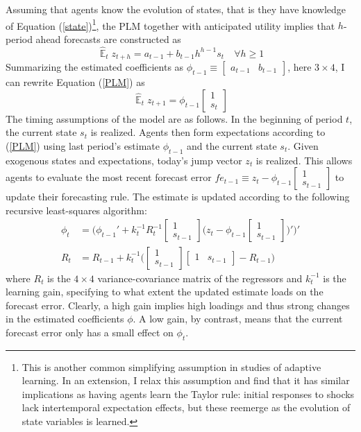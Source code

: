 \documentclass[11pt]{article}
\renewcommand{\[}{\begin{equation}}
\renewcommand{\]}{\end{equation}}
\DeclareMathOperator{\E}{\mathbb{E}}
\begin{document}
Assuming that agents know the evolution of states, that is they have knowledge of Equation (\ref{state})\footnote{This is another common simplifying assumption in studies of adaptive learning. In an extension, I relax this assumption and find that it has similar implications as having agents learn the Taylor rule: initial responses to shocks lack intertemporal expectation effects, but these reemerge as the evolution of state variables is learned.}, the PLM together with anticipated utility implies that $h$-period ahead forecasts are constructed as
\begin{equation}
\hat{\E}_t z_{t+h} = a_{t-1} + b_{t-1}h^{h-1}s_t  \quad \forall h\geq 1 \label{PLM_fcst_general}
\end{equation}
Summarizing the estimated coefficients as $\phi_{t-1} \equiv \begin{bmatrix}a_{t-1} & b_{t-1}\end{bmatrix}$, here $3\times 4$, I can rewrite Equation (\ref{PLM}) as 
\begin{equation} 
\hat{\E}_t z_{t+1} = \phi_{t-1}\begin{bmatrix} 1 \\ s_{t} \end{bmatrix} \label{PLMcompact}
\end{equation}
The timing assumptions of the model are as follows. In the beginning of period $t$, the current state $s_t$ is realized. Agents then form expectations according to (\ref{PLM}) using last period's estimate $\phi_{t-1}$ and the current state $s_t$. Given exogenous states and expectations, today's jump vector $z_t$ is realized. This allows agents to evaluate the most recent forecast error $fe_{t-1} \equiv z_t - \phi_{t-1}\begin{bmatrix} 1\\ s_{t-1}\end{bmatrix}$ to update their forecasting rule. The estimate is updated according to the following recursive least-squares algorithm:
\begin{align}
\phi_t  & = \bigg( \phi_{t-1}' + k_t^{-1} R_t^{-1}\begin{bmatrix} 1 \\ s_{t-1} \end{bmatrix}\bigg(z_{t} - \phi_{t-1} \begin{bmatrix} 1 \\ s_{t-1} \end{bmatrix} \bigg)' \bigg)' \\
R_t &= R_{t-1} +  k_t^{-1} \bigg( \begin{bmatrix} 1 \\ s_{t-1} \end{bmatrix} \begin{bmatrix} 1 & s_{t-1} \end{bmatrix}  - R_{t-1} \bigg)
\end{align}
where $R_t$ is the $4\times 4$ variance-covariance matrix of the regressors and $k_t^{-1}$ is the learning gain, specifying to what extent the updated estimate loads on the forecast error. Clearly, a high gain implies high loadings and thus strong changes in the estimated coefficients $\phi$. A low gain, by contrast, means that the current forecast error only has a small effect on $\phi_t$.
\end{document}
